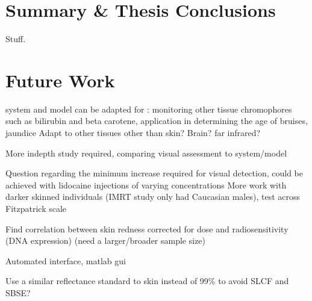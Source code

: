 \section{Summary \& Thesis Conclusions}
Stuff.

\section{Future Work}
system and model can be adapted for : monitoring other tissue chromophores such as bilirubin and beta carotene, application in determining the age of bruises, jaundice
Adapt to other tissues other than skin? Brain? far infrared?

More indepth study required, comparing visual assessment to system/model

Question regarding the minimum increase required for visual detection, could be achieved with lidocaine injections of varying concentrations
More work with darker skinned individuals (IMRT study only had Caucasian males), test across Fitzpatrick scale

Find correlation between skin redness corrected for dose and radiosensitivity (DNA expression) (need a larger/broader sample size)

Automated interface, matlab gui

Use a similar reflectance standard to skin instead of 99\% to avoid SLCF and SBSE?





